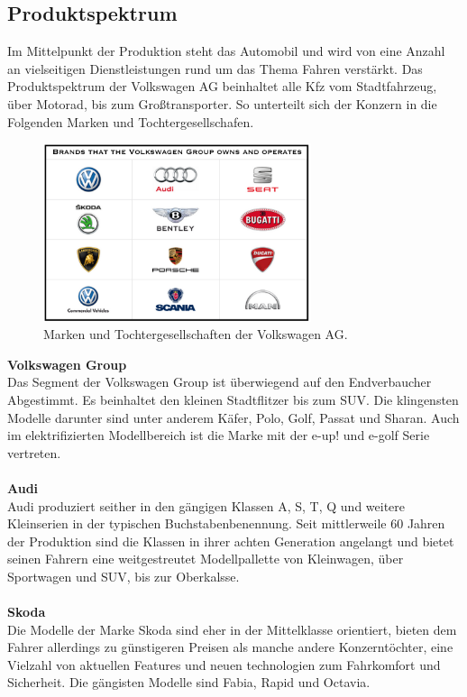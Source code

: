 \documentclass[12pt]{article}
\begin{document}
\subsection{Produktspektrum}
Im Mittelpunkt der Produktion steht das Automobil und wird von eine Anzahl an vielseitigen Dienstleistungen rund um das Thema Fahren verstärkt.
Das Produktspektrum der Volkswagen AG beinhaltet alle Kfz vom Stadtfahrzeug, über Motorad, bis zum Großtransporter.
So unterteilt sich der Konzern in die Folgenden Marken und Tochtergesellschafen.
\begin{figure}[here!]
\centering
\includegraphics[width=0.7\textwidth]{images/Volkswagen-Group-Brands}
\caption{Marken und Tochtergesellschaften der Volkswagen AG. \cite{marken}}
\end{figure}\FloatBarrier
\noindent
\textbf{Volkswagen Group}\\
Das Segment der Volkswagen Group ist überwiegend auf den Endverbaucher Abgestimmt. Es beinhaltet den kleinen Stadtflitzer bis zum SUV. Die klingensten Modelle darunter sind unter anderem Käfer, Polo, Golf, Passat und Sharan.
Auch im elektrifizierten Modellbereich ist die Marke mit der e-up! und e-golf Serie vertreten.\\
\\
\textbf{Audi}\\
Audi produziert seither in den gängigen Klassen A, S, T, Q und weitere Kleinserien in der typischen Buchstabenbenennung. Seit mittlerweile 60 Jahren der Produktion sind die Klassen in ihrer achten Generation angelangt und bietet seinen Fahrern eine weitgestreutet Modellpallette von Kleinwagen, über Sportwagen und SUV, bis zur Oberkalsse.\\
\\
\textbf{Skoda}\\
Die Modelle der Marke Skoda sind eher in der Mittelklasse orientiert, bieten dem Fahrer allerdings zu günstigeren Preisen als manche andere Konzerntöchter, eine Vielzahl von aktuellen Features und neuen technologien zum Fahrkomfort und Sicherheit.
Die gängisten Modelle sind Fabia, Rapid und Octavia.
\end{document}
